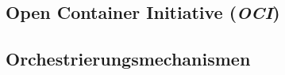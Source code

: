 \subsection{Open Container Initiative (\emph{OCI})}
\label{sec:open-container-initiative}
\subsection{Orchestrierungsmechanismen}
\label{sec:orchestrierungsmechanismen}
